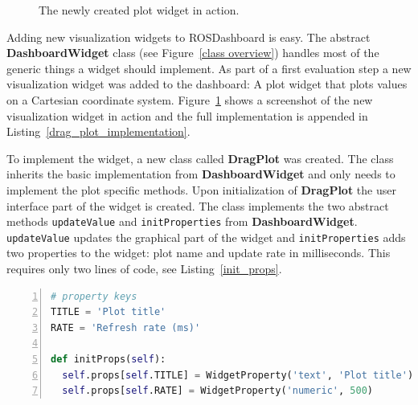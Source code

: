 \begin{figure}%
  \centering
  \caption{The newly created plot widget in action.}
  \label{plot_widget}
\end{figure}

Adding new visualization widgets to ROSDashboard is easy. The abstract \textbf{DashboardWidget} class (see Figure~\ref{class overview}) handles most of the generic things a widget should implement. As part of a first evaluation step a new visualization widget was added to the dashboard: A plot widget that plots values on a Cartesian coordinate system. Figure~\ref{plot_widget} shows a screenshot of the new visualization widget in action and the full implementation is appended in Listing~\ref{drag_plot_implementation}.

To implement the widget, a new class called \textbf{DragPlot} was created. The class inherits the basic implementation from \textbf{DashboardWidget} and only needs to implement the plot specific methods. Upon initialization of \textbf{DragPlot} the user interface part of the widget is created. The class implements the two abstract methods \verb+updateValue+ and \verb+initProperties+ from \textbf{DashboardWidget}. \verb+updateValue+ updates the graphical part of the widget and \verb+initProperties+ adds two properties to the widget: plot name and update rate in milliseconds. This requires only two lines of code, see Listing~\ref{init_props}.

\begin{lstlisting}[frame=single,caption={Implementation of initProperties in DragPlot.},label=init_props,language=Python,numbers=left,breaklines=true]
# property keys
TITLE = 'Plot title'
RATE = 'Refresh rate (ms)'

def initProps(self):
  self.props[self.TITLE] = WidgetProperty('text', 'Plot title')
  self.props[self.RATE] = WidgetProperty('numeric', 500)
\end{lstlisting}

